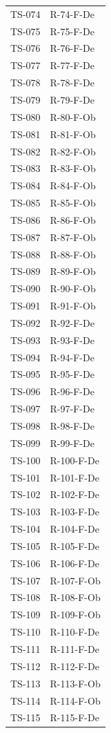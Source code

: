 \documentclass[a4paper, 11pt]{article}
\begin{document}
\begin{longtable}{>{\centering\arraybackslash}m{2.5cm} >{\centering\arraybackslash}m{3.5cm}}
TS-074 & R-74-F-De \\
TS-075 & R-75-F-De \\
TS-076 & R-76-F-De \\
TS-077 & R-77-F-De \\
TS-078 & R-78-F-De \\
TS-079 & R-79-F-De \\
TS-080 & R-80-F-Ob \\
TS-081 & R-81-F-Ob \\
TS-082 & R-82-F-Ob \\
TS-083 & R-83-F-Ob \\
TS-084 & R-84-F-Ob \\
TS-085 & R-85-F-Ob \\
TS-086 & R-86-F-Ob \\
TS-087 & R-87-F-Ob \\
TS-088 & R-88-F-Ob \\
TS-089 & R-89-F-Ob \\
TS-090 & R-90-F-Ob \\
TS-091 & R-91-F-Ob \\
TS-092 & R-92-F-De \\
TS-093 & R-93-F-De \\
TS-094 & R-94-F-De \\
TS-095 & R-95-F-De \\
TS-096 & R-96-F-De \\
TS-097 & R-97-F-De \\
TS-098 & R-98-F-De \\
TS-099 & R-99-F-De \\
TS-100 & R-100-F-De \\
TS-101 & R-101-F-De \\
TS-102 & R-102-F-De \\
TS-103 & R-103-F-De \\
TS-104 & R-104-F-De \\
TS-105 & R-105-F-De \\
TS-106 & R-106-F-De \\
TS-107 & R-107-F-Ob \\
TS-108 & R-108-F-Ob \\
TS-109 & R-109-F-Ob \\
TS-110 & R-110-F-De \\
TS-111 & R-111-F-De \\
TS-112 & R-112-F-De \\
TS-113 & R-113-F-Ob \\
TS-114 & R-114-F-Ob \\
TS-115 & R-115-F-De \\

\end{longtable}
\end{document}
